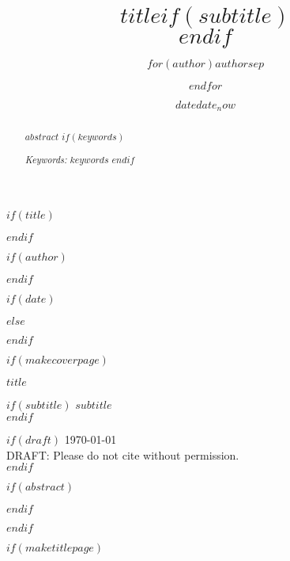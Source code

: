 \documentclass[$if(fontsize)$$fontsize$,$endif$$if(lang)$$lang$,$endif$$if(papersize)$$papersize$,$endif$$for(classoption)$$classoption$$sep$,$endfor$]{$documentclass$}
\begin{document}

\frontmatter
\pagestyle{empty}

$if(title)$\title{$title$$if(subtitle)$ \\ \vspace{0.5em}{\large $subtitle$}$endif$}$endif$

$if(author)$\author{$for(author)$$author$$sep$ \and $endfor$}$endif$

$if(date)$
\date{$date$}
$else$
\date{$date_now$}
$endif$

$if(makecoverpage)$

\begin{flushleft}

{\noindent\Huge\bfseries $title$}\\

\vspace{2\baselineskip}

$if(subtitle)$ {\Large\itshape $subtitle$}\\ $endif$

\vspace{4\baselineskip}

{\Large \theauthor}\par

$if(draft)$
\vspace{1\baselineskip}
{\today}\\
DRAFT: Please do not cite without permission.\\
$endif$ %

\end{flushleft}

\vfill

$if(abstract)$
\begin{abstract}
\setlength{\parskip}{8pt} %
\noindent $abstract$
$if(keywords)$

\emph{Keywords:} $keywords$
$endif$ %
\end{abstract}
$endif$ %

\vfill

$endif$ %

$if(maketitlepage)$
\cleardoublepage
\end{document}
